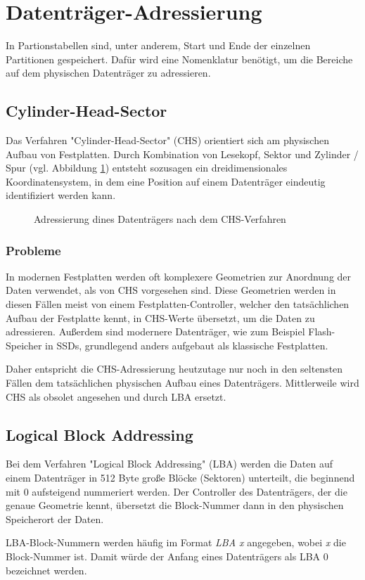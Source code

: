 \section{Datenträger-Adressierung}
\label{sec:addressing}
In Partionstabellen sind, unter anderem, Start und Ende der einzelnen Partitionen gespeichert.
Dafür wird eine Nomenklatur benötigt, um die Bereiche auf dem physischen Datenträger zu adressieren.

\subsection{Cylinder-Head-Sector}
Das Verfahren "Cylinder-Head-Sector" (CHS) orientiert sich am physischen Aufbau von Festplatten.
Durch Kombination von Lesekopf, Sektor und Zylinder / Spur (vgl. Abbildung \ref{fig:chs}) entsteht sozusagen ein dreidimensionales Koordinatensystem, in dem eine Position auf einem Datenträger eindeutig identifiziert werden kann.

\begin{figure}[ht]
    \centering
    \fbox{}
    \caption{Adressierung dines Datenträgers nach dem CHS-Verfahren}
    \label{fig:chs}
\end{figure}

\subsubsection{Probleme}
In modernen Festplatten werden oft komplexere Geometrien zur Anordnung der Daten verwendet, als von CHS vorgesehen sind.
Diese Geometrien werden in diesen Fällen meist von einem Festplatten-Controller, welcher den tatsächlichen Aufbau der Festplatte kennt, in CHS-Werte übersetzt, um die Daten zu adressieren.\cite{pollard2011}
Außerdem sind modernere Datenträger, wie zum Beispiel Flash-Speicher in SSDs, grundlegend anders aufgebaut als klassische Festplatten.

Daher entspricht die CHS-Adressierung heutzutage nur noch in den seltensten Fällen dem tatsächlichen physischen Aufbau eines Datenträgers. 
Mittlerweile wird CHS als obsolet angesehen und durch LBA ersetzt.


\subsection{Logical Block Addressing}
\label{sec:addressing:lba}
Bei dem Verfahren "Logical Block Addressing" (LBA) werden die Daten auf einem Datenträger in 512 Byte große Blöcke (Sektoren) unterteilt, die beginnend mit 0 aufsteigend nummeriert werden.
Der Controller des Datenträgers, der die genaue Geometrie kennt, übersetzt die Block-Nummer dann in den physischen Speicherort der Daten.

LBA-Block-Nummern werden häufig im Format \textit{LBA x} angegeben, wobei \textit{x} die Block-Nummer ist.
Damit würde der Anfang eines Datenträgers als LBA 0 bezeichnet werden.
